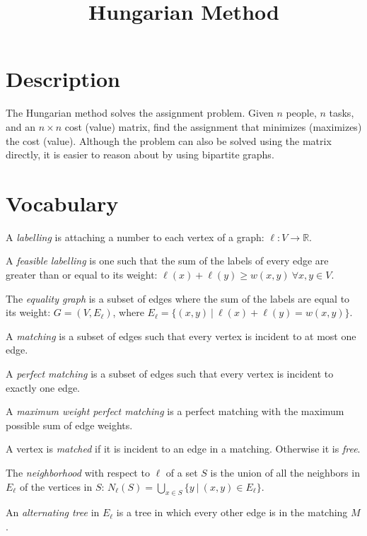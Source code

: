 \documentclass[12pt]{article}
\newcommand{\lskip}{\vspace{\baselineskip}}
\begin{document}
\title{Hungarian Method}
\author{}
\maketitle


\section*{Description}
The Hungarian method solves the assignment problem. Given $n$ people, $n$ tasks, and an $n \times n$ cost (value) matrix, find the assignment that minimizes (maximizes) the cost (value). Although the problem can also be solved using the matrix directly, it is easier to reason about by using bipartite graphs.

\section*{Vocabulary}

\noindent A \emph{labelling} is attaching a number to each vertex of a graph: $\ell: V \rightarrow \mathbb{R}$.\lskip

\noindent A \emph{feasible labelling} is one such that the sum of the labels of every edge are greater than or equal to its weight: $\ell(x) + \ell(y) \geq w(x,y) \ \forall x,y \in V$.\lskip

\noindent The \emph{equality graph} is a subset of edges where the sum of the labels are equal to its weight: $G = (V, E_\ell)$, where $E_\ell = \{ (x,y) \ | \ \ell(x) + \ell(y) = w(x,y) \}$.\lskip

\noindent A \emph{matching} is a subset of edges such that every vertex is incident to at most one edge.\lskip

\noindent A \emph{perfect matching} is a subset of edges such that every vertex is incident to exactly one edge.\lskip

\noindent A \emph{maximum weight perfect matching} is a perfect matching with the maximum possible sum of edge weights.\lskip

\noindent A vertex is \emph{matched} if it is incident to an edge in a matching. Otherwise it is \emph{free}.\lskip

\noindent The \emph{neighborhood} with respect to $\ell$ of a set $S$ is the union of all the neighbors in $E_\ell$ of the vertices in $S$: $N_\ell(S) = \bigcup_{x \in S}\{ y \ | \ (x,y) \in E_\ell \}$.\lskip

\noindent An \emph{alternating tree} in $E_\ell$ is a tree in which every other edge is in the matching $M$.\lskip
\end{document}
